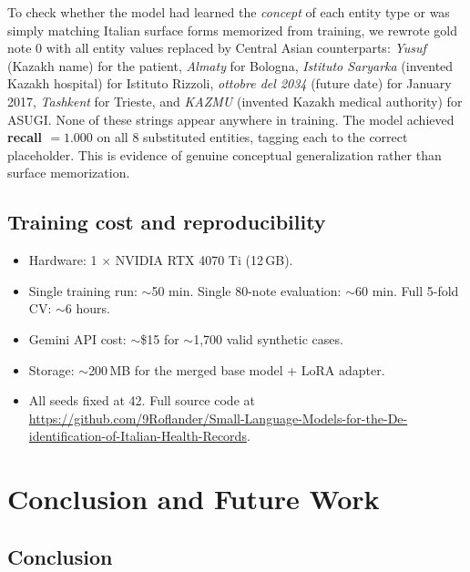 \documentclass[11pt,a4paper]{article}
\begin{document}
To check whether the model had learned the \textit{concept} of each entity type or was simply matching Italian surface forms memorized from training, we rewrote gold note 0 with all entity values replaced by Central Asian counterparts: \textit{Yusuf} (Kazakh name) for the patient, \textit{Almaty} for Bologna, \textit{Istituto Saryarka} (invented Kazakh hospital) for Istituto Rizzoli, \textit{ottobre del 2034} (future date) for January 2017, \textit{Tashkent} for Trieste, and \textit{KAZMU} (invented Kazakh medical authority) for ASUGI. None of these strings appear anywhere in training. The model achieved \textbf{recall $= 1.000$} on all 8 substituted entities, tagging each to the correct placeholder. This is evidence of genuine conceptual generalization rather than surface memorization.

\subsection{Training cost and reproducibility}

\begin{itemize}[leftmargin=*,topsep=2pt,itemsep=0pt]
\item Hardware: 1 $\times$ NVIDIA RTX 4070 Ti (12\,GB).
\item Single training run: $\sim$50 min. Single 80-note evaluation: $\sim$60 min. Full 5-fold CV: $\sim$6 hours.
\item Gemini API cost: $\sim$\$15 for $\sim$1{,}700 valid synthetic cases.
\item Storage: $\sim$200\,MB for the merged base model + LoRA adapter.
\item All seeds fixed at 42. Full source code at\\ \url{https://github.com/9Roflander/Small-Language-Models-for-the-De-identification-of-Italian-Health-Records}.
\end{itemize}

\section{Conclusion and Future Work}
\label{sec:conclusion}

\subsection{Conclusion}
\end{document}
